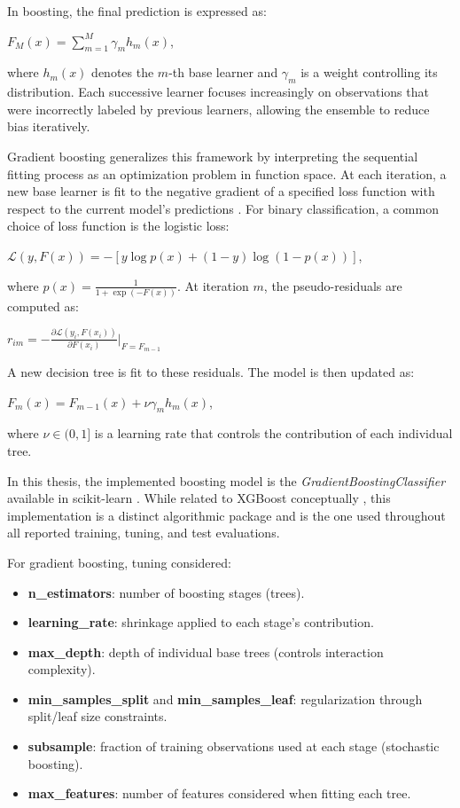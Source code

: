 \documentclass[11pt]{amsart}
\theoremstyle{definition}                  %
\theoremstyle{remark}                       %
\numberwithin{equation}{section}
\begin{document}
In boosting, the final prediction is expressed as:
\begin{center}
    $F_M(x) = \sum\limits_{m=1}^M\gamma_mh_m(x)$,
\end{center}
where $h_m(x)$ denotes the $m$-th base learner and $\gamma_m$ is a weight controlling its distribution. Each successive learner focuses increasingly on observations that were incorrectly labeled by previous learners, allowing the ensemble to reduce bias iteratively.

Gradient boosting generalizes this framework by interpreting the sequential fitting process as an optimization problem in function space. At each iteration, a new base learner is fit to the negative gradient of a specified loss function with respect to the current model’s predictions \cite{friedman2001greedy}. For binary classification, a common choice of loss function is the logistic loss:
\begin{center}
    $\mathcal{L}(y, F(x)) = -[y\log p(x) + (1 -y)\log(1-p(x))]$,
\end{center}
where $p(x) = \frac{1}{1 + \exp(-F(x))}$. At iteration $m$, the pseudo-residuals are computed as:
\begin{center}
    $r_{im} = - \frac{\partial\mathcal{L}(y_i, F(x_i))}{\partial F(x_i)}\bigg|_{F=F_{m-1}}$
\end{center}
A new decision tree is fit to these residuals. The model is then updated as:
\begin{center}
    $F_m(x) = F_{m-1}(x) + \nu\gamma_mh_m(x)$,
\end{center}
where $\nu \in (0,1]$ is a learning rate that controls the contribution of each individual tree.

In this thesis, the implemented boosting model is the \textit{GradientBoostingClassifier} available in scikit-learn \cite{pedregosa2011scikit}. While related to XGBoost conceptually \cite{chen2016xgboost}, this implementation is a distinct algorithmic package and is the one used throughout all reported training, tuning, and test evaluations.

For gradient boosting, tuning considered:
\begin{itemize}
    \item \textbf{n\_estimators}: number of boosting stages (trees).
    \item \textbf{learning\_rate}: shrinkage applied to each stage's contribution.
    \item \textbf{max\_depth}: depth of individual base trees (controls interaction complexity).
    \item \textbf{min\_samples\_split} and \textbf{min\_samples\_leaf}: regularization through split/leaf size constraints.
    \item \textbf{subsample}: fraction of training observations used at each stage (stochastic boosting).
    \item \textbf{max\_features}: number of features considered when fitting each tree.
\end{itemize}
\end{document}
